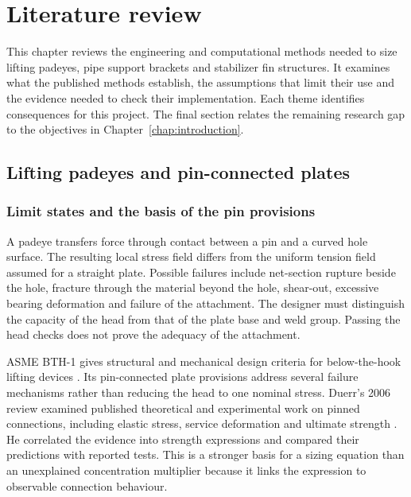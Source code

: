 \chapter{Literature review}
\label{chap:literature}

This chapter reviews the engineering and computational methods needed to size lifting padeyes, pipe support brackets and stabilizer fin structures. It examines what the published methods establish, the assumptions that limit their use and the evidence needed to check their implementation. Each theme identifies consequences for this project. The final section relates the remaining research gap to the objectives in Chapter~\ref{chap:introduction}.

\section{Lifting padeyes and pin-connected plates}
\label{sec:lit-padeyes}

\subsection{Limit states and the basis of the pin provisions}
\label{sec:lit-pin-rules}

A padeye transfers force through contact between a pin and a curved hole surface. The resulting local stress field differs from the uniform tension field assumed for a straight plate. Possible failures include net-section rupture beside the hole, fracture through the material beyond the hole, shear-out, excessive bearing deformation and failure of the attachment. The designer must distinguish the capacity of the head from that of the plate base and weld group. Passing the head checks does not prove the adequacy of the attachment.

ASME BTH-1 gives structural and mechanical design criteria for below-the-hook lifting devices \cite{asmeBTH1}. Its pin-connected plate provisions address several failure mechanisms rather than reducing the head to one nominal stress. Duerr's 2006 review examined published theoretical and experimental work on pinned connections, including elastic stress, service deformation and ultimate strength \cite{duerr2006}. He correlated the evidence into strength expressions and compared their predictions with reported tests. This is a stronger basis for a sizing equation than an unexplained concentration multiplier because it links the expression to observable connection behaviour.

